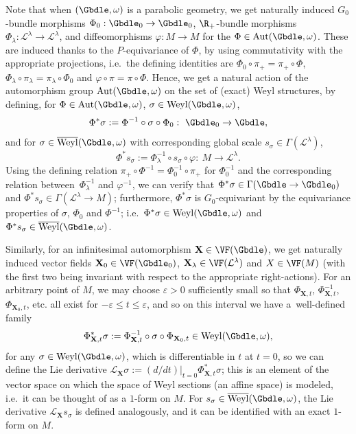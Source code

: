 Note that when $(\Gbdle,\omega)$ is a parabolic geometry, we get naturally induced $G_0$-bundle morphisms $\Phi_0:\Gbdle_0 \rightarrow \Gbdle_0$, $\R_+$-bundle morphisms $\Phi_{\lambda}: \mathcal{L}^{\lambda} \rightarrow \mathcal{L}^{\lambda}$, and dif\/feomorphisms $\varphi: M \rightarrow M$ for the $\Phi \in \mathrm{Aut}(\Gbdle,\omega)$. These are induced thanks to the $P$-equivariance of $\Phi$, by using commutativity with the appropriate projections, i.e.\ the def\/ining identities are $\Phi_0 \circ \pi_+ = \pi_+ \circ \Phi$, $\Phi_{\lambda} \circ \pi_{\lambda} = \pi_{\lambda} \circ \Phi_0$  and $\varphi \circ \pi = \pi \circ \Phi$. Hence, we get a natural action of the automorphism group $\mathrm{Aut}(\Gbdle,\omega)$ on the set of (exact) Weyl structures, by def\/ining, for $\Phi \in \mathrm{Aut}(\Gbdle,\omega)$, $\sigma \in \mathrm{Weyl}(\Gbdle,\omega)$,
\[
\Phi^*\sigma := \Phi^{-1} \circ \sigma \circ \Phi_0: \ \Gbdle_0 \rightarrow \Gbdle,
\]
and for $\sigma \in \overline{\mathrm{Weyl}}(\Gbdle,\omega)$ with corresponding global scale $s_{\sigma} \in \Gamma(\mathcal{L}^{\lambda})$,
\[
\Phi^*s_{\sigma} := \Phi_{\lambda}^{-1} \circ s_{\sigma} \circ \varphi: \ M \rightarrow \mathcal{L}^{\lambda}.
\]
Using the def\/ining relation $\pi_+ \circ \Phi^{-1} = \Phi_0^{-1} \circ \pi_+$ for $\Phi_0^{-1}$ and the corresponding relation bet\-ween~$\Phi_{\lambda}^{-1}$ and $\varphi^{-1}$, we can verify that $\Phi^*\sigma \in \Gamma(\Gbdle \rightarrow \Gbdle_0)$ and $\Phi^*s_{\sigma} \in \Gamma(\mathcal{L}^{\lambda} \rightarrow M)$; furthermore, $\Phi^*\sigma$ is $G_0$-equivariant by the equivariance properties of $\sigma$, $\Phi_0$ and $\Phi^{-1}$; i.e.\ $\Phi^*\sigma \in \mathrm{Weyl}(\Gbdle,\omega)$ and $\Phi^*s_{\sigma} \in \overline{\mathrm{Weyl}}(\Gbdle,\omega)$.

Similarly, for an inf\/initesimal automorphism $\mathbf{X} \in \VF(\Gbdle)$, we get naturally induced vector f\/ields $\mathbf{X}_0 \in \VF(\Gbdle_0)$, $\mathbf{X}_{\lambda} \in \VF(\mathcal{L}^{\lambda})$ and $X \in \VF(M)$ (with the f\/irst two being invariant with respect to the appropriate right-actions). For an arbitrary point of $M$, we may choose $\varepsilon > 0$ suf\/f\/iciently small so that $\Phi_{\mathbf{X},t}$, $\Phi_{\mathbf{X},t}^{-1}$, $\Phi_{\mathbf{X}_0,t}$, etc. all exist for $-\varepsilon \leq t \leq \varepsilon$, and so on this interval we have a~well-def\/ined family
\[
\Phi_{\mathbf{X},t}^*\sigma := \Phi_{\mathbf{X},t}^{-1} \circ \sigma \circ \Phi_{\mathbf{X}_0,t} \in \mathrm{Weyl}(\Gbdle,\omega),
\]
for any $\sigma \in \mathrm{Weyl}(\Gbdle,\omega)$, which is dif\/ferentiable in $t$ at $t=0$, so we can def\/ine the Lie derivative $\mathcal{L}_{\mathbf{X}} \sigma := (d/dt)\vert_{t=0}\Phi_{\mathbf{X},t}^*\sigma$; this is an element of the vector space on which the space of Weyl sections (an af\/f\/ine space) is modeled, i.e.\ it can be thought of as a $1$-form on $M$. For $s_{\sigma} \in \overline{\mathrm{Weyl}}(\Gbdle,\omega)$, the Lie derivative $\mathcal{L}_{\mathbf{X}}s_{\sigma}$ is def\/ined analogously, and it can be identif\/ied with an exact $1$-form on $M$.


